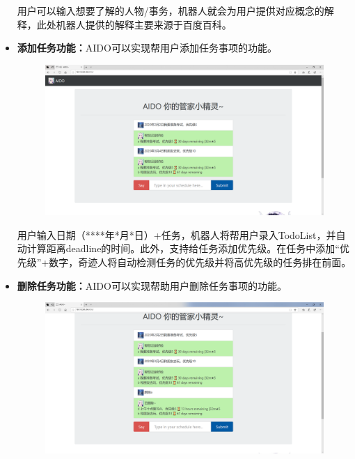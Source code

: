 \documentclass[logo,reportComp]{thesis}
\begin{document}
\begin{itemize}
用户可以输入想要了解的人物/事务，机器人就会为用户提供对应概念的解释，此处机器人提供的解释主要来源于百度百科。
\item \textbf{添加任务功能：}AIDO可以实现帮用户添加任务事项的功能。
\begin{figure}[H]
\centering
\includegraphics[width=\linewidth]{fig/add_task}
\end{figure}

用户输入日期（****年*月*日）+任务，机器人将帮用户录入TodoList，并自动计算距离deadline的时间。此外，支持给任务添加优先级。在任务中添加“优先级”+数字，奇迹人将自动检测任务的优先级并将高优先级的任务排在前面。
\item \textbf{删除任务功能：}AIDO可以实现帮助用户删除任务事项的功能。
\begin{figure}[H]
\centering
\includegraphics[width=\linewidth]{fig/del_task}
\end{figure}


\end{itemize}
\end{document}
